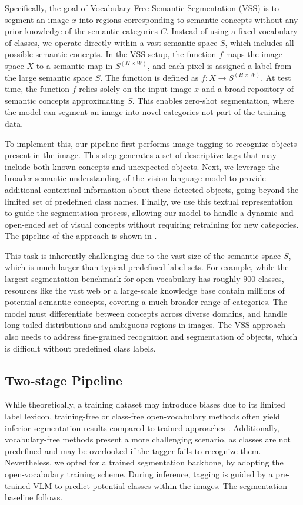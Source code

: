 Specifically, the goal of Vocabulary-Free Semantic Segmentation (VSS) is to segment an image \( x \) into regions corresponding to semantic concepts without any prior knowledge of the semantic categories \( C \). Instead of using a fixed vocabulary of classes, we operate directly within a vast semantic space \( S \), which includes all possible semantic concepts.
In the VSS setup, the function \( f \) maps the image space \( X \) to a semantic map in \( S^{(H \times W)}\), and each pixel is assigned a label from the large semantic space \( S \). The function is defined as \( f: X \to S^{(H \times W)} \).
At test time, the function \( f \) relies solely on the input image \( x \) and a broad repository of semantic concepts approximating \( S \). This enables zero-shot segmentation, where the model can segment an image into novel categories  not part of the training data.

To implement this, our pipeline first performs image tagging to recognize objects present in the image. This step generates a set of descriptive tags that may include both known concepts and unexpected objects. Next, we leverage the broader semantic understanding of the vision-language model to provide additional contextual information about these detected objects, going beyond the limited set of predefined class names. Finally, we use this %
textual representation to guide the segmentation process, allowing our model to handle a dynamic and open-ended set of visual concepts without requiring retraining for new categories. The pipeline of the approach is shown in .

This task is inherently challenging due to the vast size of the semantic space \( S \), which is much larger than typical predefined label sets. For example, while the largest segmentation benchmark for open vocabulary has roughly 900 classes, resources like the vast web or a large-scale knowledge base contain millions of potential semantic concepts, covering a much broader range of categories. The model must differentiate between concepts across diverse domains, and handle long-tailed distributions and ambiguous regions in images. The VSS approach also needs to address fine-grained recognition and segmentation of objects, which is difficult without predefined class labels.

\subsection{Two-stage Pipeline}\label{sec:training}
While theoretically, a training dataset may introduce biases due to its limited label lexicon, training-free or class-free open-vocabulary methods often yield inferior segmentation results compared to trained approaches \cite{shin2024towards}. Additionally, vocabulary-free methods present a more challenging scenario, as classes are not predefined and may be overlooked if the tagger fails to recognize them. Nevertheless, we opted for a trained segmentation backbone, by %
adopting the open-vocabulary training scheme. 
During inference, tagging is guided by a pre-trained VLM to predict potential classes within the images. %
The segmentation baseline %
follows.


